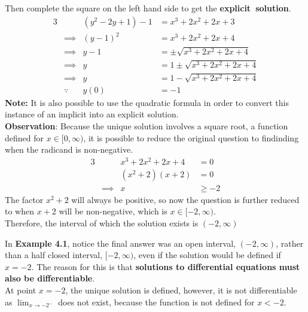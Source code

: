 \documentclass[twoside]{report}
\begin{document}
    \begin{example*}[4.1 (cont.)]
        Then complete the square on the left hand side to get the \textbf{explicit~solution}.
        \begin{alignat}{3}
            && (y^{2} - 2y + 1) - 1 &= x^{3} + 2x^{2} + 2x + 3\\
            &\implies &(y - 1)^{2} &= x^{3} + 2x^{2} + 2x + 4\\
            &\implies & y - 1 &= \pm \sqrt{x^{3}  + 2x^{2} + 2x + 4}\\
            &\implies & y &= 1 \pm \sqrt{x^{3}  + 2x^{2} + 2x + 4}\\
            &\implies & y &= 1 - \sqrt{x^{3}  + 2x^{2} + 2x + 4}\\
            &\because & y(0) &= -1
        \end{alignat}
        \textbf{Note:} It is also possible to use the quadratic formula in order to convert this instance of an implicit into an explicit solution.\\
        \textbf{Observation}: Because the unique solution involves a square root, a function defined for $x \in [0, \infty)$, it is possible to reduce the original question to findinding when the radicand is non-negative.
        \begin{alignat}{3}
            &&x^{3} + 2 x^{2} + 2x + 4\ &= 0\\
            &&(x^{2} + 2)(x + 2) &= 0\\
            &\implies&x &\geq -2
        \end{alignat}
        The factor $x^{2} + 2$ will always be positive, so now the question is further reduced to when $x + 2$ will be non-negative, which is $x \in [-2, \infty)$.\\
        Therefore, the interval of which the solution exists is $(-2, \infty)$
    \end{example*}
    \begin{remark}
        In \textbf{Example 4.1}, notice the final answer was an open interval, $(-2, \infty)$, rather than a half closed interval, $[-2, \infty)$, even if the solution would be defined if $x = -2$. The reason for this is that \textbf{solutions to differential equations must also be differentiable}.\\
        At point $x = -2$, the unique solution is defined, however, it is not differentiable as $\lim_{x \to -2^{-}}$ does not exist, because the function is not defined for $x < -2$.
    \end{remark}
    \np
\end{document}
